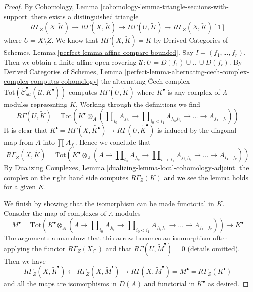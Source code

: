 \begin{proof}
By Cohomology, Lemma \ref{cohomology-lemma-triangle-sections-with-support}
there exists a distinguished triangle
$$
R\Gamma_Z(X, \widetilde{K})
\to R\Gamma(X, \widetilde{K})
\to R\Gamma(U, \widetilde{K})
\to R\Gamma_Z(X, \widetilde{K})[1]
$$
where $U = X \setminus Z$. We know that $R\Gamma(X, \widetilde{K}) = K$
by Derived Categories of Schemes, Lemma
\ref{perfect-lemma-affine-compare-bounded}.
Say $I = (f_1, \ldots, f_r)$. Then we obtain a finite affine
open covering $\mathcal{U} : U = D(f_1) \cup \ldots \cup D(f_r)$.
By Derived Categories of Schemes, Lemma
\ref{perfect-lemma-alternating-cech-complex-complex-computes-cohomology}
the alternating {\v C}ech complex
$\text{Tot}(\check{\mathcal{C}}_{alt}^\bullet(\mathcal{U},
\widetilde{K^\bullet}))$
computes $R\Gamma(U, \widetilde{K})$ where $K^\bullet$ is any
complex of $A$-modules representing $K$. Working through the
definitions we find
$$
R\Gamma(U, \widetilde{K}) =
\text{Tot}\left(
K^\bullet \otimes_A
(\prod\nolimits_{i_0} A_{f_{i_0}} \to
\prod\nolimits_{i_0 < i_1} A_{f_{i_0}f_{i_1}} \to
\ldots \to A_{f_1\ldots f_r})\right)
$$
It is clear that
$K^\bullet = R\Gamma(X, \widetilde{K^\bullet}) \to
R\Gamma(U, \widetilde{K}^\bullet)$
is induced by the diagonal map from $A$ into $\prod A_{f_i}$.
Hence we conclude that
$$
R\Gamma_Z(X, \widetilde{K}) =
\text{Tot}\left(
K^\bullet \otimes_A
(A \to \prod\nolimits_{i_0} A_{f_{i_0}} \to
\prod\nolimits_{i_0 < i_1} A_{f_{i_0}f_{i_1}} \to
\ldots \to A_{f_1\ldots f_r})\right)
$$
By Dualizing Complexes, Lemma \ref{dualizing-lemma-local-cohomology-adjoint}
the complex on the right hand side computes $R\Gamma_Z(K)$
and we see the lemma holds for a given $K$.

\medskip\noindent
We finish by showing that the isomorphism can be made functorial in $K$.
Consider the map of complexes of $A$-modules
$$
M^\bullet = \text{Tot}\left(
K^\bullet \otimes_A
(A \to \prod\nolimits_{i_0} A_{f_{i_0}} \to
\prod\nolimits_{i_0 < i_1} A_{f_{i_0}f_{i_1}} \to
\ldots \to A_{f_1\ldots f_r})\right)
\longrightarrow
K^\bullet
$$
The arguments above show that this arrow becomes an isomorphism after
applying the functor $R\Gamma_Z(X, \widetilde{\ })$ and that
$R\Gamma(U, \widetilde{M}^\bullet) = 0$ (details omitted). Then we have
$$
R\Gamma_Z(X, \widetilde{K}^\bullet)
\leftarrow
R\Gamma_Z(X, \widetilde{M}^\bullet)
\rightarrow
R\Gamma(X, \widetilde{M}^\bullet) = M^\bullet = R\Gamma_Z(K^\bullet)
$$
and all the maps are isomorphisms in $D(A)$ and functorial in $K^\bullet$
as desired.
\end{proof}


